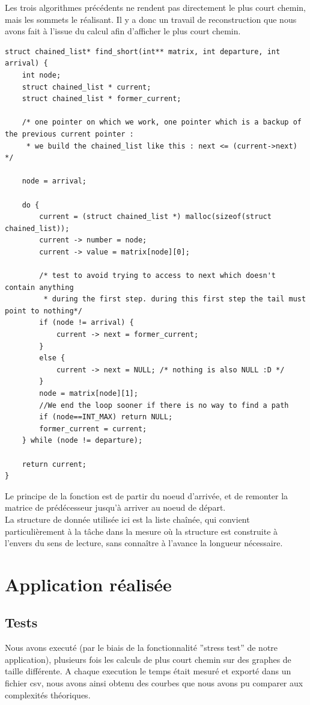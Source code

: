 \documentclass[a4paper,12pt,final] {article}
\begin{document}
Les trois algorithmes précédents ne rendent pas directement le plus court chemin, mais les sommets le réalisant. Il y a donc un travail de reconstruction que nous avons fait à l'issue du calcul afin d'afficher le plus court chemin.\\

\begin{lstlisting}
struct chained_list* find_short(int** matrix, int departure, int arrival) {
	int node;
	struct chained_list * current;
	struct chained_list * former_current;
	
	/* one pointer on which we work, one pointer which is a backup of the previous current pointer :
	 * we build the chained_list like this : next <= (current->next) */
	
	node = arrival;
	
	do {
		current = (struct chained_list *) malloc(sizeof(struct chained_list));
		current -> number = node;
		current -> value = matrix[node][0];
		
		/* test to avoid trying to access to next which doesn't contain anything 
		 * during the first step. during this first step the tail must point to nothing*/
		if (node != arrival) {
			current -> next = former_current;
		}
		else {
			current -> next = NULL; /* nothing is also NULL :D */
		}
		node = matrix[node][1];
		//We end the loop sooner if there is no way to find a path
		if (node==INT_MAX) return NULL;
		former_current = current;
	} while (node != departure);
	
	return current;
}
\end{lstlisting}

Le principe de la fonction est de partir du noeud d'arrivée, et de remonter la matrice de prédécesseur jusqu'à arriver au noeud de départ. \\

La structure de donnée utilisée ici est la liste chaînée, qui convient particulièrement à la tâche dans la mesure où la structure est construite à l'envers du sens de lecture, sans connaître à l'avance la longueur nécessaire.\\

\newpage
\section{Application réalisée}
\subsection{Tests}
Nous avons executé (par le biais de la fonctionnalité ''stress test'' de notre application), plusieurs fois les calculs de plus court chemin sur des graphes de taille différente. A chaque execution le temps était mesuré et exporté dans un fichier csv, nous avons ainsi obtenu des courbes que nous avons pu comparer aux complexités théoriques.
\end{document}
